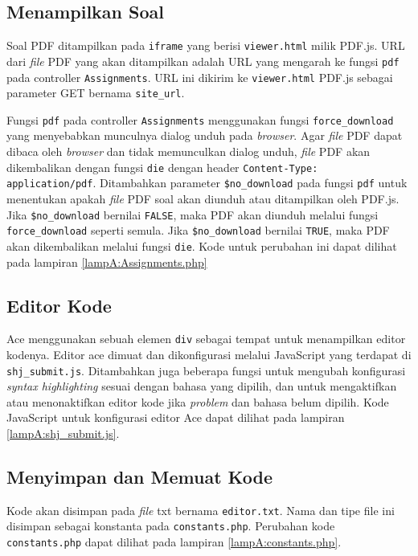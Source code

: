 \subsection{Menampilkan Soal}
\label{subsec:5:soal}

Soal PDF ditampilkan pada \verb|iframe| yang berisi \verb|viewer.html| milik PDF.js. URL dari \textit{file} PDF yang akan ditampilkan adalah URL yang mengarah ke fungsi \verb|pdf| pada controller \verb|Assignments|. URL ini dikirim ke \verb|viewer.html| PDF.js sebagai parameter GET bernama \verb|site_url|.

Fungsi \verb|pdf| pada controller \verb|Assignments| menggunakan fungsi \verb|force_download| yang menyebabkan munculnya dialog unduh pada \textit{browser}. Agar \textit{file} PDF dapat dibaca oleh \textit{browser} dan tidak memunculkan dialog unduh, \textit{file} PDF akan dikembalikan dengan fungsi \verb|die| dengan header \verb|Content-Type: application/pdf|. Ditambahkan parameter \verb|$no_download| pada fungsi \verb|pdf| untuk menentukan apakah \textit{file} PDF soal akan diunduh atau ditampilkan oleh PDF.js. Jika \verb|$no_download| bernilai \verb|FALSE|, maka PDF akan diunduh melalui fungsi \verb|force_download| seperti semula. Jika \verb|$no_download| bernilai \verb|TRUE|, maka PDF akan dikembalikan melalui fungsi \verb|die|. Kode untuk perubahan ini dapat dilihat pada lampiran \ref{lampA:Assignments.php}

\subsection{Editor Kode}
\label{subsec:5:editor}

Ace menggunakan sebuah elemen \verb|div| sebagai tempat untuk menampilkan editor kodenya. Editor ace dimuat dan dikonfigurasi melalui JavaScript yang terdapat di \verb|shj_submit.js|. Ditambahkan juga beberapa fungsi untuk mengubah konfigurasi \textit{syntax highlighting} sesuai dengan bahasa yang dipilih, dan untuk mengaktifkan atau menonaktifkan editor kode jika \textit{problem} dan bahasa belum dipilih. Kode JavaScript untuk konfigurasi editor Ace dapat dilihat pada lampiran \ref{lampA:shj_submit.js}.

\subsection{Menyimpan dan Memuat Kode}
\label{subsec:5:simpan}

Kode akan disimpan pada \textit{file} txt bernama \verb|editor.txt|. Nama dan tipe file ini disimpan sebagai konstanta pada \verb|constants.php|. Perubahan kode \verb|constants.php| dapat dilihat pada lampiran \ref{lampA:constants.php}.

